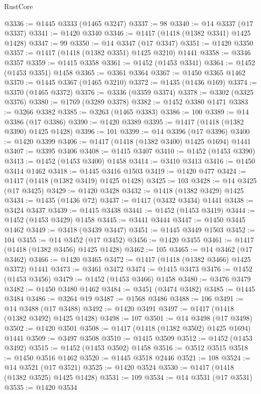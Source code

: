 \begin{lexlean}{RustCore}
\begin{coremodule}
@3336 := @1445 @3333 (@1465 @3247)
@3337 := 98
@3340 := @14 @3337 (@17 @3337)
@3341 := @1420 @3340
@3346 := @1417 (@1418 (@1382 @3341) @1425 @1428)
@3347 := 99
@3350 := @14 @3347 (@17 @3347)
@3351 := @1420 @3350
@3357 := @1417 (@1418 (@1382 @3351) @1425 @3210) @1441
@3358 := @3346 @3357
@3359 := @1415 @3358
@3361 := @1452 (@1453 @3341)
@3364 := @1452 (@1453 @3351) @1458
@3365 := @3361 @3364
@3367 := @1450 @3365 @1462
@3370 := @1445 @3367 (@1465 @3210)
@3372 := @1435 (@1436 @169)
@3374 := @3370 (@1465 @3372)
@3376 := @3336 (@3359 @3374)
@3378 := @3302 (@3325 @3376)
@3380 := @1769 (@3289 @3378)
@3382 := @1452 @3380 @1471
@3383 := @3266 @3382
@3385 := @3263 (@1465 @3383)
@3386 := 100
@3389 := @14 @3386 (@17 @3386)
@3390 := @1420 @3389
@3395 := @1417 (@1418 (@1382 @3390) @1425 @1428)
@3396 := 101
@3399 := @14 @3396 (@17 @3396)
@3400 := @1420 @3399
@3406 := @1417 (@1418 (@1382 @3400) @1425 @1694) @1441
@3407 := @3395 @3406
@3408 := @1415 @3407
@3410 := @1452 (@1453 @3390)
@3413 := @1452 (@1453 @3400) @1458
@3414 := @3410 @3413
@3416 := @1450 @3414 @1462
@3418 := @1445 @3416 @1503
@3419 := @1420 @477
@3424 := @1417 (@1418 (@1382 @3419) @1425 @1428)
@3425 := 103
@3428 := @14 @3425 (@17 @3425)
@3429 := @1420 @3428
@3432 := @1418 (@1382 @3429) @1425
@3434 := @1435 (@1436 @72)
@3437 := @1417 (@3432 @3434) @1441
@3438 := @3424 @3437
@3439 := @1415 @3438
@3441 := @1452 (@1453 @3419)
@3444 := @1452 (@1453 @3429) @1458
@3445 := @3441 @3444
@3447 := @1450 @3445 @1462
@3449 := @3418 (@3439 @3447)
@3451 := @1445 @3449 @1503
@3452 := 104
@3455 := @14 @3452 (@17 @3452)
@3456 := @1420 @3455
@3461 := @1417 (@1418 (@1382 @3456) @1425 @1428)
@3462 := 105
@3465 := @14 @3462 (@17 @3462)
@3466 := @1420 @3465
@3472 := @1417 (@1418 (@1382 @3466) @1425 @3372) @1441
@3473 := @3461 @3472
@3474 := @1415 @3473
@3476 := @1452 (@1453 @3456)
@3479 := @1452 (@1453 @3466) @1458
@3480 := @3476 @3479
@3482 := @1450 @3480 @1462
@3484 := @3451 (@3474 @3482)
@3485 := @1445 @3484
@3486 := @3264 @19
@3487 := @1568 @3486
@3488 := 106
@3491 := @14 @3488 (@17 @3488)
@3492 := @1420 @3491
@3497 := @1417 (@1418 (@1382 @3492) @1425 @1428)
@3498 := 107
@3501 := @14 @3498 (@17 @3498)
@3502 := @1420 @3501
@3508 := @1417 (@1418 (@1382 @3502) @1425 @1694) @1441
@3509 := @3497 @3508
@3510 := @1415 @3509
@3512 := @1452 (@1453 @3492)
@3515 := @1452 (@1453 @3502) @1458
@3516 := @3512 @3515
@3518 := @1450 @3516 @1462
@3520 := @1445 @3518 @2446
@3521 := 108
@3524 := @14 @3521 (@17 @3521)
@3525 := @1420 @3524
@3530 := @1417 (@1418 (@1382 @3525) @1425 @1428)
@3531 := 109
@3534 := @14 @3531 (@17 @3531)
@3535 := @1420 @3534

\end{coremodule}
\end{lexlean}

